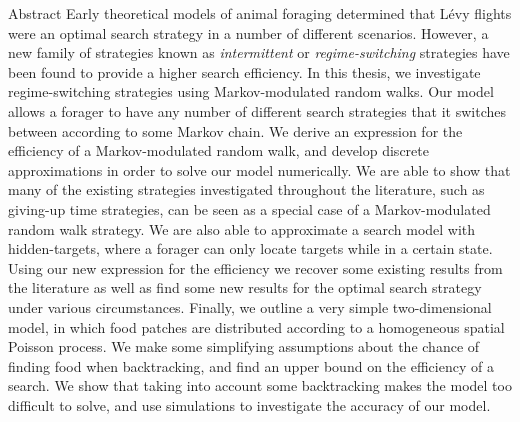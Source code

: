 \begin{chapter}{Abstract}
\label{ch:abstract}
Early theoretical models of animal foraging determined that L\'{e}vy flights were an optimal search strategy in a number of different scenarios.
However, a new family of strategies known as \emph{intermittent} or \emph{regime-switching} strategies have been found to provide a higher search efficiency.
In this thesis, we investigate regime-switching strategies using Markov-modulated random walks. Our model allows a forager to have any number of different search strategies that it switches between according to some Markov chain.
We derive an expression for the efficiency of a Markov-modulated random walk, and develop discrete approximations in order to solve our model numerically.
We are able to show that many of the existing strategies investigated throughout the literature, such as giving-up time strategies, can be seen as a special case of a Markov-modulated random walk strategy.
We are also able to approximate a search model with hidden-targets, where a forager can only locate targets while in a certain state.
Using our new expression for the efficiency we recover some existing results from the literature as well as find some new results for the optimal search strategy under various circumstances.
Finally, we outline a very simple two-dimensional model, in which food patches are distributed according to a homogeneous spatial Poisson process.
We make some simplifying assumptions about the chance of finding food when backtracking, and find an upper bound on the efficiency of a search.
We show that taking into account some backtracking makes the model too difficult to solve, and use simulations to investigate the accuracy of our model.
\end{chapter}


